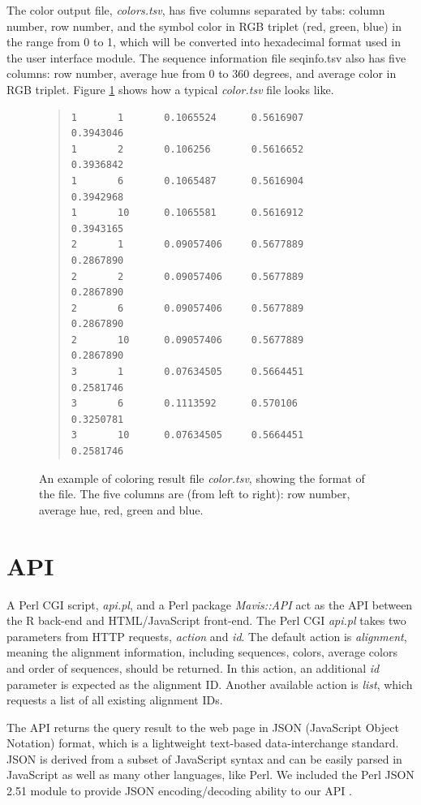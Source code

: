 The color output file, \emph{colors.tsv}, has five columns separated by tabs: column number, row number, and the symbol color in RGB triplet (red, green, blue) in the range from 0 to 1, which will be converted into hexadecimal format used in the user interface module. The sequence information file seqinfo.tsv also has five columns: row number, average hue from 0 to 360 degrees, and average color in RGB triplet. Figure \ref{fig:color.tsv} shows how a typical \emph{color.tsv} file looks like.
\begin{figure}[hb]
\begin{quote}
\begin{verbatim}
1       1       0.1065524      0.5616907       0.3943046
1       2       0.106256       0.5616652       0.3936842
1       6       0.1065487      0.5616904       0.3942968
1       10      0.1065581      0.5616912       0.3943165
2       1       0.09057406     0.5677889       0.2867890
2       2       0.09057406     0.5677889       0.2867890
2       6       0.09057406     0.5677889       0.2867890
2       10      0.09057406     0.5677889       0.2867890
3       1       0.07634505     0.5664451       0.2581746
3       6       0.1113592      0.570106        0.3250781
3       10      0.07634505     0.5664451       0.2581746
\end{verbatim}
\end{quote}
\caption[Example of Coloring Result File]{An example of coloring result file \emph{color.tsv}, showing the format of the file. The five columns are (from left to right): row number, average hue, red, green and blue.}\label{fig:color.tsv}
\end{figure}

\section{API}

A Perl CGI script, \emph{api.pl}, and a Perl package \emph{Mavis::API} act as the API between the R back-end and HTML/JavaScript front-end. The Perl CGI \emph{api.pl} takes two parameters from HTTP requests, \emph{action} and \emph{id}. The default action is \emph{alignment}, meaning the alignment information, including sequences, colors, average colors and order of sequences, should be returned. In this action, an additional \emph{id} parameter is expected as the alignment ID. Another available action is \emph{list}, which requests a list of all existing alignment IDs.

The API returns the query result to the web page in JSON (JavaScript Object Notation) format, which is a lightweight text-based data-interchange standard. JSON is derived from a subset of JavaScript syntax and can be easily parsed in JavaScript as well as many other languages, like Perl. We included the Perl JSON 2.51 module to provide JSON encoding/decoding ability to our API \cite{crockford2006application}.

